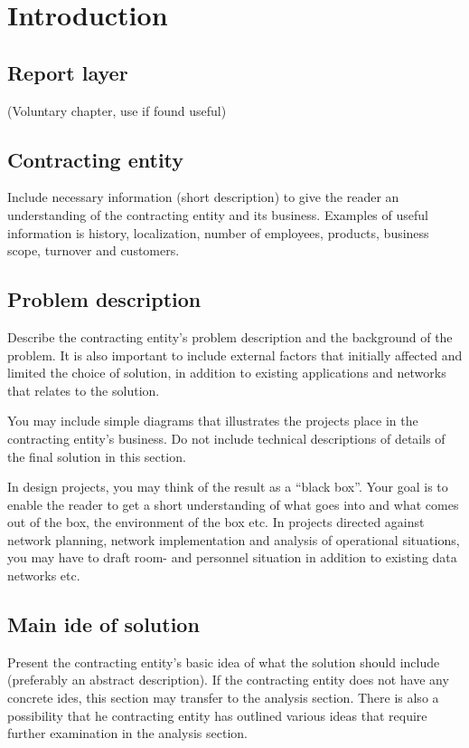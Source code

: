 \section{Introduction}
\subsection{Report layer}
(Voluntary chapter, use if found useful)

\subsection{Contracting entity}
Include necessary information (short description) to give the reader an understanding of the contracting entity and its business. Examples of useful information is history, localization, number of employees, products, business scope, turnover and customers.

\subsection{Problem description}
Describe the contracting entity’s problem description and the background of the problem. It is also important to include external factors that initially affected and limited the choice of solution, in addition to existing applications and networks that relates to the solution.

You may include simple diagrams that illustrates the projects place in the contracting entity’s business. Do not include technical descriptions of details of the final solution in this section.

In design projects, you may think of the result as a “black box”. Your goal is to enable the reader to get a short understanding of what goes into and what comes out of the box, the environment of the box etc. In projects directed against network planning, network implementation and analysis of operational situations, you may have to draft room- and personnel situation in addition to existing data networks etc.

\subsection{Main ide of solution}
Present the contracting entity’s basic idea of what the solution should include (preferably an abstract description). If the contracting entity does not have any concrete ides, this section may transfer to the analysis section. There is also a possibility that he contracting entity has outlined various ideas that require further examination in the analysis section.

\pagebreak